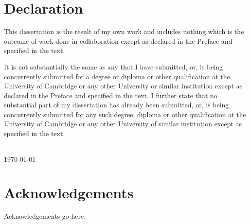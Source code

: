 \thispagestyle{empty}
\chapter*{Declaration}
\thispagestyle{empty}
This dissertation is the result of my own work and includes nothing which is the outcome of work done in collaboration except as declared in the Preface and specified in the text.

It is not substantially the same as any that I have submitted, or, is being concurrently submitted for a degree or diploma or other qualification at the University of Cambridge or any other University or similar institution except as declared in the Preface and specified in the text. I further state that no substantial part of my dissertation has already been submitted, or, is being concurrently submitted for any such degree, diploma or other qualification at the University of Cambridge or any other University of similar institution except as specified in the text
\vspace{15mm}

\noindent \MyName \\
\today

\chapter*{Acknowledgements}
\thispagestyle{empty}

Acknowledgements go here.
